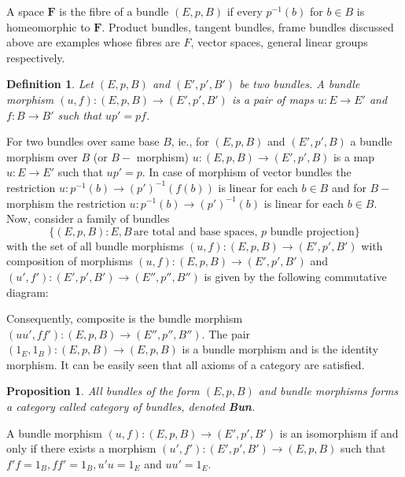 \documentclass{amsart}
\theoremstyle{plain}
\newtheorem{prop}{Proposition}
\newtheorem{defn}{Definition}
\begin{document}
	A space $\textbf{F}$ is the fibre of a bundle  $(E, p, B)$ if every $p^{-1}(b)$ for $b \in B$ is homeomorphic to $\textbf{F}$.  
	Product bundles, tangent bundles, frame bundles discussed above are examples whose fibres are $F$, vector spaces, general linear groups respectively.

	\begin{defn}
		Let $(E, p, B)$ and $(E',p',B')$ be two bundles. A bundle morphism $(u,f) : (E, p, B) \rightarrow (E',p',B')$ is a pair of maps $u: E \rightarrow E'$ and $f: B \rightarrow B'$ such that $up' = pf$.
	\end{defn}
	For two bundles over same base $B$, ie., for  $(E, p, B)$ and $(E',p',B)$ a bundle morphism over $B$ (or $B-$ morphism) $u : (E, p, B) \rightarrow (E',p',B)$ is a map $u: E \rightarrow E'$ such that $up' = p$.	
	In case of morphism of vector bundles the restriction $u: p^{-1}(b) \rightarrow (p')^{-1}(f(b))$ is linear for each $b \in B$ and for $B-$ morphism the restriction $u: p^{-1}(b) \rightarrow (p')^{-1}(b)$ is linear for each $b \in B$.\\
	
	Now, consider a family of bundles $$\{(E, p, B) : E,B \,\text{are total and base spaces, $p$ bundle projection}\}$$
	with the set of all bundle morphisms $(u,f) : (E, p, B) \rightarrow (E',p',B')$ with composition of morphisms  $(u,f) : (E, p, B) \rightarrow (E',p',B')$ and $(u',f') : (E',p',B') \rightarrow (E'',p'',B'')$ 
	 is given by the following commutative diagram: 
	\begin{center}
	\end{center}
	Consequently, composite is the bundle morphism $(uu', ff'):  (E, p, B) \rightarrow (E'',p'',B'')$. The pair $(1_E,1_B):(E, p, B) \rightarrow (E, p, B)$ is a bundle morphism and is the identity morphism. It can be easily seen that all axioms of a category are satisfied.  
	 \begin{prop}
	 	All bundles of the form  $(E, p, B)$ and bundle morphisms forms a category called category of bundles, denoted \textbf{Bun}.
	 \end{prop}
 A bundle morphism $(u,f) : (E, p, B) \rightarrow (E',p',B')$  is an isomorphism if and only if there exists a morphism  $(u',f') : (E',p',B') \rightarrow (E, p, B)$ such that $f'f = 1_B, ff' = 1_B, u'u = 1_E$ and $uu' = 1_E$.
	
\end{document}
